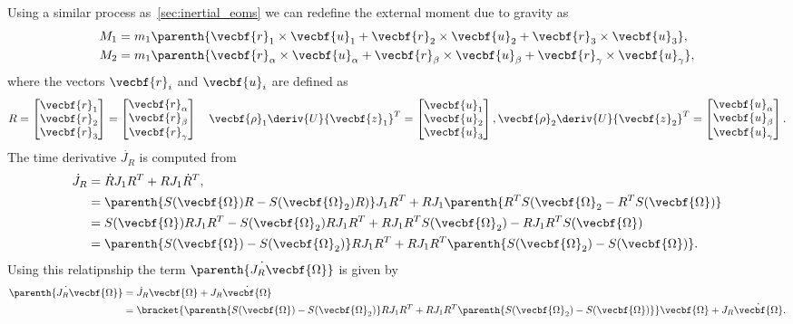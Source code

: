 \documentclass[11pt, reqno]{article}    %
\begin{document}
Using a similar process as~\cref{sec:inertial_eoms} we can redefine the external moment due to gravity as
\begin{align}
    M_1 &= m_1 \parenth{\vecbf{r}_1 \times \vecbf{u}_1 + \vecbf{r}_2 \times \vecbf{u}_2 + \vecbf{r}_3 \times \vecbf{u}_3} , \\
    M_2 &= m_1 \parenth{\vecbf{r}_\alpha \times \vecbf{u}_\alpha + \vecbf{r}_\beta \times \vecbf{u}_\beta + \vecbf{r}_\gamma \times \vecbf{u}_\gamma} , 
\end{align}
where the vectors \( \vecbf{r}_i \) and \( \vecbf{u}_i \) are defined as
\begin{align*}
    R = \begin{bmatrix} \vecbf{r}_1 \\ \vecbf{r}_2 \\ \vecbf{r}_3 \end{bmatrix} = \begin{bmatrix} \vecbf{r}_\alpha \\ \vecbf{r}_\beta \\ \vecbf{r}_\gamma \end{bmatrix} \quad
    \vecbf{\rho}_1 \deriv{U}{\vecbf{z}_1}^T = \begin{bmatrix} \vecbf{u}_1 \\ \vecbf{u}_2 \\ \vecbf{u}_3 \end{bmatrix}, \vecbf{\rho}_2 \deriv{U}{\vecbf{z}_2}^T = \begin{bmatrix} \vecbf{u}_\alpha \\ \vecbf{u}_\beta \\ \vecbf{u}_\gamma \end{bmatrix} .
\end{align*}
The time derivative \( \dot{J_R}\) is computed from
\begin{align*}
    \dot{J}_R &= \dot{R} J_1 R^T + R J_1 \dot{R}^T , \\
    &= \parenth{S(\vecbf{\Omega})R - S(\vecbf{\Omega}_2) R)} J_1 R^T + R J_1 \parenth{R^T S(\vecbf{\Omega}_2 - R^T S(\vecbf{\Omega}) } \\
    &= S(\vecbf{\Omega}) R J_1 R^T - S(\vecbf{\Omega}_2) R J_1 R^T + R J_1 R^T S(\vecbf{\Omega}_2) - R J_1 R^T S(\vecbf{\Omega}) \\
    &=  \parenth{S(\vecbf{\Omega}) - S(\vecbf{\Omega}_2)} R J_1 R^T + R J_1 R^T \parenth{S(\vecbf{\Omega}_2) - S(\vecbf{\Omega})} .
\end{align*}
Using this relatipnship the term \( \dot{\parenth{J_R \vecbf{\Omega}}}\) is given by
\begin{align*}
    \dot{\parenth{J_R \vecbf{\Omega}}} &= \dot{J}_R \vecbf{\Omega} + J_R \dot{\vecbf{\Omega}} \\
    &= \bracket{\parenth{S(\vecbf{\Omega}) - S(\vecbf{\Omega}_2)} R J_1 R^T + R J_1 R^T \parenth{S(\vecbf{\Omega}_2) - S(\vecbf{\Omega})}} \vecbf{\Omega} + J_R \dot{\vecbf{\Omega}} .
\end{align*}
\end{document}
